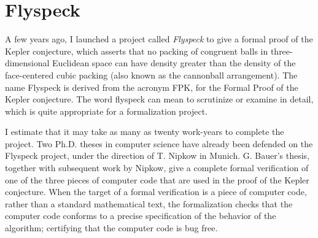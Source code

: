 \documentclass{llncs}
\begin{document}
\bigskip
\noindent
{}




\section{Flyspeck}

A few years ago, I launched a project called {\it Flyspeck} to
give a formal proof of the Kepler conjecture, which asserts that
no packing of congruent balls in three-dimensional Euclidean space
can have density greater than the density of the face-centered cubic
packing (also known as the cannonball arrangement).  The name
Flyspeck is derived from the acronym FPK, for the Formal Proof of the Kepler
conjecture.  The word flyspeck can mean to scrutinize or examine in
detail, which is quite appropriate for a formalization project.

I estimate that it may take as many as twenty work-years to complete
the project. Two Ph.D. theses in computer science have already been
defended on the Flyspeck project, under the direction of T. Nipkow in
Munich.  G. Bauer's thesis, together with subsequent work by Nipkow,
give a complete formal verification of one of the three  pieces of computer
code that are used in the proof of the Kepler conjecture.  When
the target of a formal verification is a piece of computer code, rather
than a standard mathematical text, the formalization checks that the
computer code conforms to a precise specification of the behavior
of the algorithm; certifying that the computer code is bug free.
\end{document}
